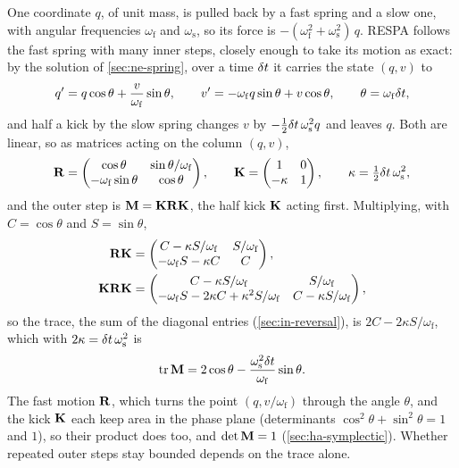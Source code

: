 One coordinate $q$, of unit mass, is pulled back by a fast spring and a
slow one, with angular frequencies $\omega_{\mathrm f}$ and
$\omega_{\mathrm s}$, so its force is $-(\omega_{\mathrm f}^2 +
\omega_{\mathrm s}^2)\,q$. RESPA follows the fast spring with many inner
steps, closely enough to take its motion as exact: by the solution of
\cref{sec:ne-spring}, over a time $\delta t$ it carries the state $(q, v)$ to
\begin{equation*}
   q' = q\cos\theta + \frac{v}{\omega_{\mathrm f}}\sin\theta , \qquad
   v' = -\omega_{\mathrm f}q\sin\theta + v\cos\theta , \qquad
   \theta = \omega_{\mathrm f}\delta t ,
\end{equation*}
and half a kick by the slow spring changes $v$ by $-\frac12\delta t\,
\omega_{\mathrm s}^2q$ and leaves $q$. Both are linear, so as matrices
acting on the column $(q, v)$,
\begin{equation*}
   \bm{\mathrm{R}} = \begin{pmatrix} \cos\theta & \sin\theta/\omega_{\mathrm f}\\
   -\omega_{\mathrm f}\sin\theta & \cos\theta \end{pmatrix} , \qquad
   \bm{\mathrm{K}} = \begin{pmatrix} 1 & 0\\ -\kappa & 1 \end{pmatrix} , \qquad
   \kappa = \tfrac12\delta t\,\omega_{\mathrm s}^2 ,
\end{equation*}
and the outer step is $\bm{\mathrm{M}} = \bm{\mathrm{K}}\bm{\mathrm{R}}\bm{\mathrm{K}}$, the half kick
$\bm{\mathrm{K}}$ acting first. Multiplying, with $C = \cos\theta$ and $S =
\sin\theta$,
\begin{align*}
   \bm{\mathrm{R}}\bm{\mathrm{K}} &= \begin{pmatrix} C - \kappa S/\omega_{\mathrm f} &
      S/\omega_{\mathrm f}\\ -\omega_{\mathrm f}S - \kappa C & C
      \end{pmatrix} ,\\
   \bm{\mathrm{K}}\bm{\mathrm{R}}\bm{\mathrm{K}} &= \begin{pmatrix} C - \kappa S/\omega_{\mathrm f} &
      S/\omega_{\mathrm f}\\ -\omega_{\mathrm f}S - 2\kappa C
      + \kappa^2S/\omega_{\mathrm f} & C - \kappa S/\omega_{\mathrm f}
      \end{pmatrix} ,
\end{align*}
so the trace, the sum of the diagonal entries (\cref{sec:in-reversal}),
is $2C - 2\kappa S/\omega_{\mathrm f}$, which with $2\kappa = \delta t\,
\omega_{\mathrm s}^2$ is
\begin{equation}
   \operatorname{tr}\bm{\mathrm{M}} = 2\cos\theta
   - \frac{\omega_{\mathrm s}^2\delta t}{\omega_{\mathrm f}}\sin\theta .
   \label{eq:cs-trace}
\end{equation}
The fast motion $\bm{\mathrm{R}}$, which turns the point $(q, v/\omega_{\mathrm f})$
through the angle $\theta$, and the kick $\bm{\mathrm{K}}$ each keep area in the
phase plane (determinants $\cos^2\theta + \sin^2\theta = 1$ and $1$), so
their product does too, and $\det\bm{\mathrm{M}} = 1$ (\cref{sec:ha-symplectic}).
Whether repeated outer steps stay bounded depends on the trace alone.


